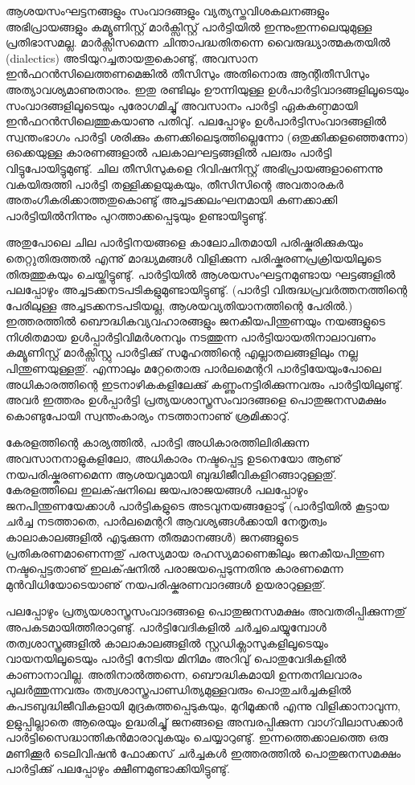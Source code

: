 ﻿
\vskip 2pt

ആശയസംഘട്ടനങ്ങളും സംവാദങ്ങളും വ്യത്യസ്തവിശകലനങ്ങളും അഭിപ്രായങ്ങളും കമ്യൂണിസ്റ്റ് മാര്‍ക്സിസ്റ്റ് പാര്‍ട്ടിയില്‍ 
ഇന്നുംഇന്നലെയുമുള്ള പ്രതിഭാസമല്ല. മാര്‍ക്സിസമെന്ന ചിന്താപദ്ധതിതന്നെ വൈരുദ്ധ്യാത്മകതയില്‍ (dialectics) 
അടിയുറച്ചതായതുകൊണ്ടു്, അവസാന ഇന്‍ഫറന്‍സിലെത്തണമെങ്കില്‍ തീസിസും അതിനൊരു ആന്റിതീസിസും 
അത്യാവശ്യമാണുതാനും. ഇതു രണ്ടിലും ഊന്നിയുള്ള ഉള്‍പാര്‍ട്ടിവാദങ്ങളിലൂടെയും സംവാദങ്ങളിലൂടെയും പുരോഗമിച്ചു് 
അവസാനം പാര്‍ട്ടി ഏകകണ്ഠമായി ഇന്‍ഫറന്‍സിലെത്തുകയാണു പതിവു്. പലപ്പോഴും ഉള്‍പാര്‍ട്ടിസംവാദങ്ങളില്‍ സ്വന്തംഭാഗം 
പാര്‍ട്ടി ശരിക്കും കണക്കിലെടുത്തില്ലെന്നോ (ഒതുക്കിക്കളഞ്ഞെന്നോ) ഒക്കെയുള്ള കാരണങ്ങളാല്‍ 
പലകാലഘട്ടങ്ങളില്‍ പലരും പാര്‍ട്ടി വിട്ടുപോയിട്ടുമുണ്ടു്. ചില തീസിസുകളെ റിവിഷനിസ്റ്റ് അഭിപ്രായങ്ങളാണെന്നു 
വകയിരുത്തി പാര്‍ട്ടി തള്ളിക്കളയുകയും, തീസിസിന്റെ അവതാരകര്‍ അതംഗീകരിക്കാത്തതുകൊണ്ടു് 
അച്ചടക്കലംഘനമായി കണക്കാക്കി പാര്‍ട്ടിയില്‍നിന്നും പുറത്താക്കപ്പെടുയും ഉണ്ടായിട്ടുണ്ടു്.

അതുപോലെ ചില പാര്‍ട്ടിനയങ്ങളെ കാലോചിതമായി പരിഷ്കരിക്കുകയും തെറ്റുതിരുത്തല്‍ എന്നു് മാദ്ധ്യമങ്ങള്‍ വിളിക്കുന്ന 
പരിഷ്കരണപ്രക്രിയയിലൂടെ തിരുത്തുകയും ചെയ്തിട്ടുണ്ടു്. പാര്‍ട്ടിയില്‍ ആശയസംഘട്ടനമുണ്ടായ ഘട്ടങ്ങളില്‍ പലപ്പോഴും 
അച്ചടക്കനടപടികളുമുണ്ടായിട്ടുണ്ടു്. (പാര്‍ട്ടി വിരുദ്ധപ്രവര്‍ത്തനത്തിന്റെ പേരിലുള്ള അച്ചടക്കനടപടിയല്ല, 
ആശയവ്യതിയാനത്തിന്റെ പേരില്‍.) ഇത്തരത്തില്‍ ബൌദ്ധികവ്യവഹാരങ്ങളും ജനകീയപിന്തുണയും നയങ്ങളുടെ 
നിശിതമായ ഉള്‍പ്പാര്‍ട്ടിവിമര്‍ശനവും നടത്തുന്ന പാര്‍ട്ടിയായതിനാലാവണം കമ്യൂണിസ്റ്റ് മാര്‍ക്സിസ്റ്റു പാര്‍ട്ടിക്കു് 
സമൂഹത്തിന്റെ എല്ലാതലങ്ങളിലും നല്ല പിന്തുണയുള്ളതു്. എന്നാലും മറ്റേതൊരു പാര്‍ലമെന്ററി പാര്‍ട്ടിയേയുംപോലെ 
അധികാരത്തിന്റെ ഇടനാഴികകളിലേക്കു് കണ്ണുംനട്ടിരിക്കുന്നവരും പാര്‍ട്ടിയിലുണ്ടു്. അവര്‍ ഇത്തരം ഉള്‍പ്പാര്‍ട്ടി 
പ്രത്യയശാസ്ത്രസംവാദങ്ങളെ പൊതുജനസമക്ഷം കൊണ്ടുപോയി സ്വന്തംകാര്യം നടത്താനാണു് ശ്രമിക്കാറു്.

കേരളത്തിന്റെ കാര്യത്തില്‍, പാര്‍ട്ടി അധികാരത്തിലിരിക്കുന്ന അവസാനനാളുകളിലോ, അധികാരം നഷ്ടപ്പെട്ട 
ഉടനെയോ ആണു് നയപരിഷ്കരണമെന്ന ആശയവുമായി ബുദ്ധിജീവികളിറങ്ങാറുള്ളതു്. കേരളത്തിലെ ഇലക്‌ഷനിലെ 
ജയപരാജയങ്ങള്‍ പലപ്പോഴും ജനപിന്തുണയേക്കാള്‍ പാര്‍ട്ടികളുടെ അടവുനയങ്ങളോടു് (പാര്‍ട്ടിയില്‍ കൂട്ടായ ചര്‍ച്ച 
നടത്താതെ, പാര്‍ലമെന്ററി ആവശ്യങ്ങള്‍ക്കായി നേതൃത്വം കാലാകാലങ്ങളില്‍ എടുക്കുന്ന തീരുമാനങ്ങള്‍) ജനങ്ങളുടെ 
പ്രതികരണമാണെന്നതു് പരസ്യമായ രഹസ്യമാണെങ്കിലും ജനകീയപിന്തുണ നഷ്ടപ്പെട്ടതാണു് ഇലക്‌ഷനില്‍ 
പരാജയപ്പെടുന്നതിനു കാരണമെന്ന മുന്‍വിധിയോടെയാണു് നയപരിഷ്കരണവാദങ്ങള്‍ ഉയരാറുള്ളതു്.

പലപ്പോഴും പ്രത്യയശാസ്ത്രസംവാദങ്ങളെ പൊതുജനസമക്ഷം അവതരിപ്പിക്കുന്നതു് അപകടമായിത്തീരാറുണ്ടു്. 
പാര്‍ട്ടിവേദികളില്‍ ചര്‍ച്ചചെയ്യുമ്പോള്‍ തത്വശാസ്ത്രങ്ങളില്‍ കാലാകാലങ്ങളില്‍ സ്റ്റഡിക്ലാസുകളിലൂടെയും 
വായനയിലൂടെയും പാര്‍ട്ടി നേടിയ മിനിമം അറിവു് പൊതുവേദികളില്‍ കാണാനാവില്ല. അതിനാല്‍ത്തന്നെ, ബൌദ്ധികമായി 
ഉന്നതനിലവാരം പുലര്‍ത്തുന്നവരും തത്വശാസ്ത്രപാണ്ഡിത്യമുള്ളവരും പൊതുചര്‍ച്ചകളില്‍ കപടബുദ്ധിജീവികളായി 
മുദ്രകുത്തപ്പെടുകയും, മുറിമൂക്കന്‍ എന്നു വിളിക്കാനാവുന്ന, ഉളുപ്പില്ലാതെ ആരെയും ഉദ്ധരിച്ചു് ജനങ്ങളെ അമ്പരപ്പിക്കുന്ന 
വാഗ്‌വിലാസക്കാര്‍ പാര്‍ട്ടിസൈദ്ധാന്തികന്‍മാരാവുകയും ചെയ്യാറുണ്ടു്. ഇന്നത്തെക്കാലത്തെ ഒരു മണിക്കൂര്‍ 
ടെലിവിഷന്‍ ഫോക്കസ് ചര്‍ച്ചകള്‍ ഇത്തരത്തില്‍ പൊതുജനസമക്ഷം പാര്‍ട്ടിക്കു് പലപ്പോഴും ക്ഷീണമുണ്ടാക്കിയിട്ടുണ്ടു്.

